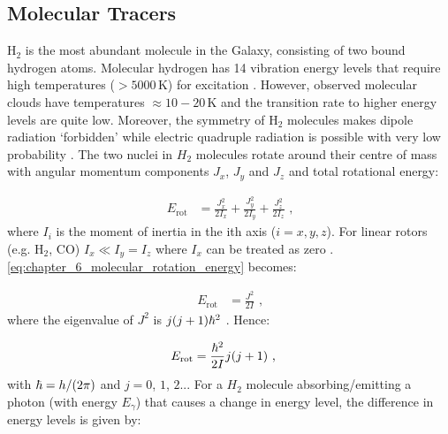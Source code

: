 \subsection{Molecular Tracers} \label{sec:06_molecular_tracers}

H$_2$ is the most abundant molecule in the Galaxy, consisting of two bound hydrogen atoms. Molecular hydrogen has 14 vibration energy levels that require high temperatures ($>5000\,\si{\kelvin}$) for excitation \citep{2011piim.book.....D}. However, observed molecular clouds have temperatures $\approx 10-20\,\si{\kelvin}$ \citep{2001RvMP...73.1031F} and the transition rate to higher energy levels are quite low. Moreover, the symmetry of H$_2$ molecules makes dipole radiation `forbidden' while electric quadruple radiation is possible with very low probability \citep{2011piim.book.....D}.
\newpar 
The two nuclei in $H_2$ molecules rotate around their centre of mass with angular momentum components $J_x$, $J_y$ and $J_z$ \citep{alma99117570501811} and total rotational energy:

\begin{equation}
    \begin{aligned}
        E_\text{rot}&=\frac{J_x^2}{2I_x}+\frac{J_y^2}{2I_y}+\frac{J_z^2}{2I_z}\text{ ,}
    \end{aligned} \label{eq:chapter_6_molecular_rotation_energy}
\end{equation}
\noindent where $I_{i}$ is the moment of inertia in the ith axis ($i=x,y,z$). For linear rotors (e.g. H$_2$, CO)  $I_x\ll I_y=I_z$ where $I_x$ can be treated as zero \citep{alma9928060792901811}. \autoref{eq:chapter_6_molecular_rotation_energy} becomes:

\begin{equation}
    \begin{aligned}
        E_\text{rot}&=\frac{J^2}{2I}\text{ ,}
    \end{aligned}
\end{equation}
\noindent where the eigenvalue of $J^2$ is $j\qty(j+1)\hbar^2$ \citep{alma99117570501811}. Hence:

\begin{equation}
    \begin{aligned}
        E_\text{rot}&=\frac{\hbar^2}{2I}j\qty(j+1)\text{ ,}
    \end{aligned}
\end{equation}
\noindent with $\hbar=h/\qty(2\pi)$ and $j=0$, $1$, $2$... For a $H_2$ molecule absorbing/emitting a photon (with energy $E_\gamma$) that causes a change in energy level, the difference in energy levels is given by:

